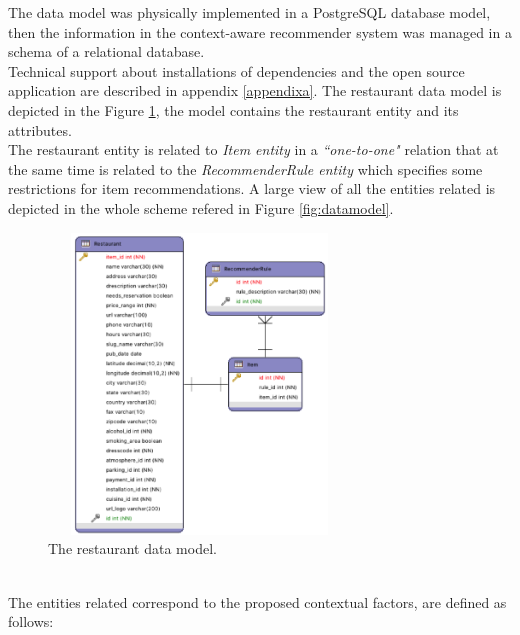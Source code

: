 The data model was physically implemented in a PostgreSQL database model, 
then the information in the context-aware recommender system was
managed in a schema of a relational database. \\ Technical support 
about installations of dependencies and the open source application are 
described in appendix  \ref{appendixa}.
The restaurant data model is depicted in the 
Figure  \ref{fig:restaurantmodeldata}, the model contains the restaurant
entity and its attributes. \\ The restaurant entity is related to
\textit{Item entity} in a \textit{``one-to-one"} relation that at the
same time is related to the \textit{RecommenderRule entity} which
specifies some restrictions for item recommendations. A large view of
all the entities related is depicted in the whole scheme refered in
Figure  \ref{fig:datamodel}.
\begin{figure}
\captionsetup{justification=centering,margin=2cm,font=footnotesize}
\centering
\includegraphics[width=8cm,height=8cm,keepaspectratio]{img/data-resmodel.png}
\caption{The restaurant data model.}
\label{fig:restaurantmodeldata}     
\end{figure}
\\ The entities related correspond to the proposed contextual factors, 
are defined as follows: 
